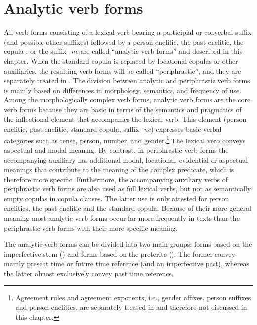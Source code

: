 \chapter{Analytic verb forms}
\label{cpt:Analytic verb forms}

All verb forms consisting of a lexical verb bearing a participial or converbal suffix (and possible other suffixes) followed by a person enclitic, the past enclitic, the copula , or the suffix -\textit{ne} are called ``analytic verb forms'' and described in this chapter. When the standard copula is replaced by locational copulas or other auxiliaries, the resulting verb forms will be called ``periphrastic'', and they are separately treated in . The division between analytic and periphrastic verb forms is mainly based on differences in morphology, semantics, and frequency of use. Among the morphologically complex verb forms, analytic verb forms are the core verb forms because they are basic in terms of the semantics and pragmatics of the inflectional element that accompanies the lexical verb. This element (person enclitic, past enclitic, standard copula, suffix -\textit{ne}) expresses basic verbal categories such as tense, person, number, and gender.\footnote{Agreement rules and agreement exponents, i.e., gender affixes, person suffixes and person enclitics, are separately treated in  and therefore not discussed in this chapter.} The lexical verb conveys aspectual and modal meaning. By contrast, in periphrastic verb forms the accompanying auxiliary has additional modal, locational, evidential or aspectual meanings that contribute to the meaning of the complex predicate, which is therefore more specific. Furthermore, the accompanying auxiliary verbs of periphrastic verb forms are also used as full lexical verbs, but not as semantically empty copulas in copula clauses. The latter use is only attested for person enclitics, the past enclitic and the standard copula. Because of their more general meaning most analytic verb forms occur far more frequently in texts than the periphrastic verb forms with their more specific meaning.     

The analytic verb forms can be divided into two main groups: forms based on the imperfective stem () and forms based on the preterite (). The former convey mainly present time or future time reference (and an imperfective past), whereas the latter almost exclusively convey past time reference.


